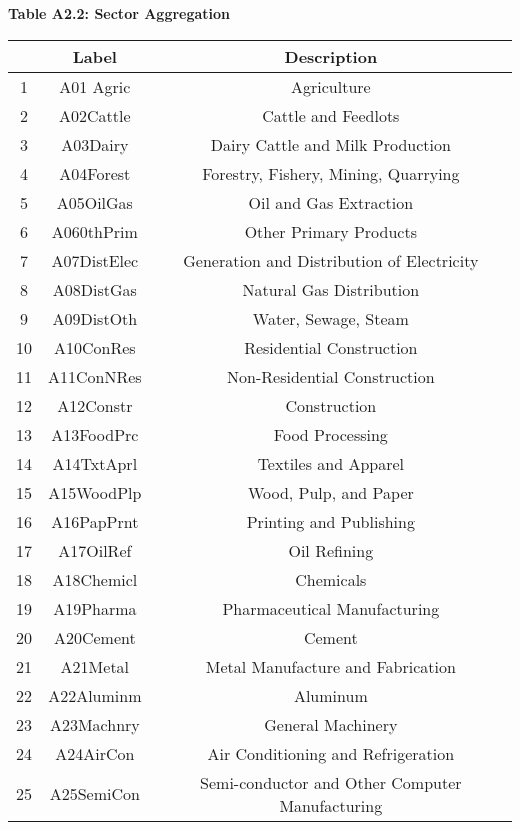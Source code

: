 \documentclass{article}
\begin{document}
\newpage
\textbf{Table A2.2: Sector Aggregation}\\[5pt]
\begin{center}
\begin{footnotesize}
\begin{tabular}{|c|c|c|}
\hline & Label & Description \\
\hline 1 & A01 Agric & Agriculture \\
\hline 2 & A02Cattle & Cattle and Feedlots \\
\hline 3 & A03Dairy & Dairy Cattle and Milk Production \\
\hline 4 & A04Forest & Forestry, Fishery, Mining, Quarrying \\
\hline 5 & A05OilGas & Oil and Gas Extraction \\
\hline 6 & A060thPrim & Other Primary Products \\
\hline 7 & A07DistElec & Generation and Distribution of Electricity \\
\hline 8 & A08DistGas & Natural Gas Distribution \\
\hline 9 & A09DistOth & Water, Sewage, Steam \\
\hline 10 & A10ConRes & Residential Construction \\
\hline 11 & A11ConNRes & Non-Residential Construction \\
\hline 12 & A12Constr & Construction \\
\hline 13 & A13FoodPrc & Food Processing \\
\hline 14 & A14TxtAprl & Textiles and Apparel \\
\hline 15 & A15WoodPlp & Wood, Pulp, and Paper \\
\hline 16 & A16PapPrnt & Printing and Publishing \\
\hline 17 & A17OilRef & Oil Refining \\
\hline 18 & A18Chemicl & Chemicals \\
\hline 19 & A19Pharma & Pharmaceutical Manufacturing \\
\hline 20 & A20Cement & Cement \\
\hline 21 & A21Metal & Metal Manufacture and Fabrication \\
\hline 22 & A22Aluminm & Aluminum \\
\hline 23 & A23Machnry & General Machinery \\
\hline 24 & A24AirCon & Air Conditioning and Refrigeration \\
\hline 25 & A25SemiCon & Semi-conductor and Other Computer Manufacturing \\

\end{tabular}
\end{footnotesize}
\end{center}
\end{document}
